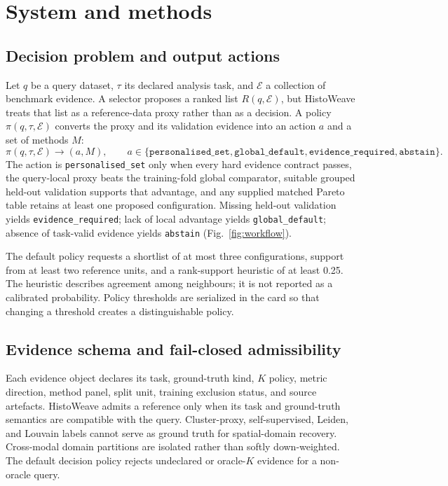 \documentclass[12pt]{article}
\newcommand{\software}{HistoWeave}
\begin{document}
\section{System and methods}

\subsection{Decision problem and output actions}

Let \(q\) be a query dataset, \(\tau\) its declared analysis task, and
\(\mathcal{E}\) a collection of benchmark evidence. A selector proposes a
ranked list \(R(q,\mathcal{E})\), but \software{} treats that list as a
reference-data proxy rather than as a decision. A policy
\(\pi(q,\tau,\mathcal{E})\) converts the proxy and its validation evidence
into an action \(a\) and a set of methods \(M\):
\[
  \pi(q,\tau,\mathcal{E}) \longrightarrow
  (a,M), \qquad
  a \in
  \{\texttt{personalised\_set},\texttt{global\_default},
  \texttt{evidence\_required},\texttt{abstain}\}.
\]
The action is \texttt{personalised\_set} only when every hard evidence
contract passes, the query-local proxy beats the training-fold global
comparator, suitable grouped held-out validation supports that advantage, and
any supplied matched Pareto table retains at least one proposed
configuration. Missing held-out validation yields
\texttt{evidence\_required}; lack of local advantage yields
\texttt{global\_default}; absence of task-valid evidence yields
\texttt{abstain} (Fig.~\ref{fig:workflow}).

The default policy requests a shortlist of at most three configurations,
support from at least two reference units, and a rank-support heuristic of at
least 0.25. The heuristic describes agreement among neighbours; it is not
reported as a calibrated probability. Policy thresholds are serialized in
the card so that changing a threshold creates a distinguishable policy.

\subsection{Evidence schema and fail-closed admissibility}

Each evidence object declares its task, ground-truth kind, \(K\) policy,
metric direction, method panel, split unit, training exclusion status, and
source artefacts. \software{} admits a reference only when its task and
ground-truth semantics are compatible with the query. Cluster-proxy,
self-supervised, Leiden, and Louvain labels cannot serve as ground truth for
spatial-domain recovery. Cross-modal domain partitions are isolated rather
than softly down-weighted. The default decision policy rejects undeclared or
oracle-\(K\) evidence for a non-oracle query.
\end{document}
